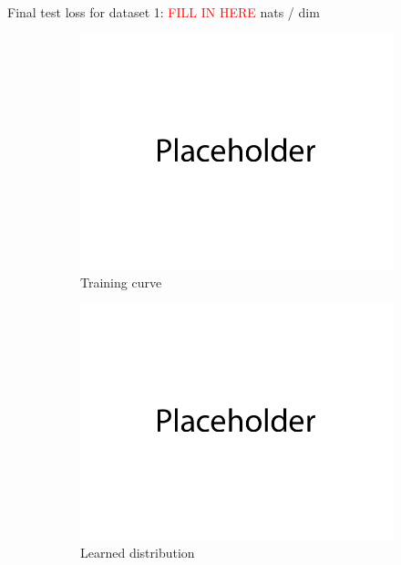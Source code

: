 \documentclass{article}
\begin{document}
Final test loss for dataset 1: \textcolor{red}{FILL IN HERE} nats / dim
\begin{figure}[H]
    \centering
    \begin{subfigure}{0.32\textwidth}
        \centering
        \includegraphics[width=\textwidth]{figures/q1_dset1_train_plot.png}
        \caption{Training curve}
    \end{subfigure}
    \begin{subfigure}{0.32\textwidth}
        \centering
        \includegraphics[width=\textwidth]{figures/q1_dset1_densities.png}
        \caption{Learned distribution}
    \end{subfigure}
    \begin{subfigure}{0.32\textwidth}

\end{subfigure}
\end{figure}
\end{document}

